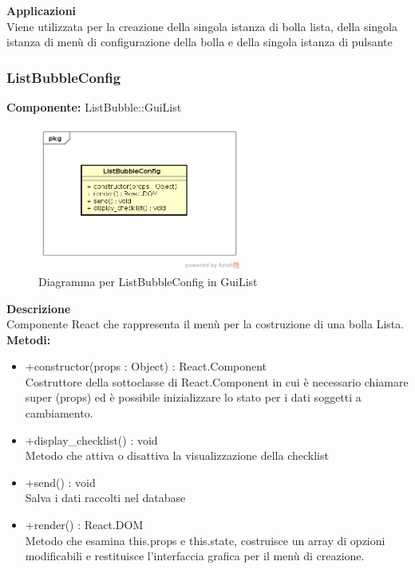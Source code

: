 \textbf{Applicazioni}\\
Viene utilizzata per la creazione della singola istanza di bolla lista, della singola istanza di menù di configurazione della bolla e della singola istanza di pulsante 


\clearpage

\subsubsection{ListBubbleConfig}
\textbf{Componente:}  ListBubble::GuiList\\
   \FloatBarrier
   \begin{figure}[ht]
   \centering
   \includegraphics[width=0.6\textwidth]{img/single-ListBubbleConfig.png}
   \caption{{Diagramma per ListBubbleConfig in GuiList}}
\end{figure}
\FloatBarrier
\textbf{Descrizione}\\
Componente React che rappresenta il menù per la costruzione di una bolla Lista.
\\
\textbf{Metodi:} 
\begin{itemize}
\item +constructor(props : Object) : React.Component 
\\
Costruttore della sottoclasse di React.Component in cui è necessario chiamare super (props) ed è possibile inizializzare lo stato per i dati soggetti a cambiamento.

\item +display\_checklist() : void 
\\
Metodo che attiva o disattiva la visualizzazione della checklist

\item +send() : void 
\\
Salva i dati raccolti nel database

\item +render() : React.DOM
\\
Metodo che esamina this.props e this.state, costruisce un array di opzioni modificabili e restituisce l'interfaccia grafica per il menù di creazione.
\end{itemize}

